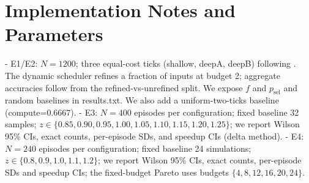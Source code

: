 \section{Implementation Notes and Parameters}
\label{app:impl}
- E1/E2: $N{=}1200$; three equal-cost ticks (shallow, deepA, deepB) following \cite{Huang2018MSDNet,Wang2018SkipNet}. The dynamic scheduler refines a fraction of inputs at budget 2; aggregate accuracies follow from the refined-vs-unrefined split. We expose $f$ and $p_{\mathrm{sel}}$ and random baselines in results.txt. We also add a uniform-two-ticks baseline (compute=0.6667).
- E3: $N{=}400$ episodes per configuration; fixed baseline 32 samples; $z \in \{0.85,0.90,0.95,1.00,1.05,1.10,1.15,1.20,1.25\}$; we report Wilson 95\% CIs, exact counts, per-episode SDs, and speedup CIs (delta method).
- E4: $N{=}240$ episodes per configuration; fixed baseline 24 simulations; $z \in \{0.8,0.9,1.0,1.1,1.2\}$; we report Wilson 95\% CIs, exact counts, per-episode SDs and speedup CIs; the fixed-budget Pareto uses budgets $\{4,8,12,16,20,24\}$.

